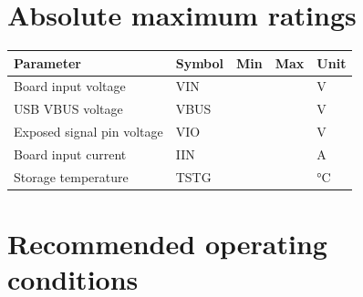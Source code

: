 \documentclass[10pt,a4paper,oneside]{report}
\begin{document}
\section{Absolute maximum ratings}\label{wiki-hardware-electrical-ratings--absolute-maximum-ratings}

{\def\LTcaptype{none} %
\begin{longtable}[]{@{}
  >{\raggedright\arraybackslash}p{}
  >{\raggedright\arraybackslash}p{}
  >{\raggedright\arraybackslash}p{}
  >{\raggedright\arraybackslash}p{}
  >{\raggedright\arraybackslash}p{}@{}}
\toprule\noalign{}
\begin{minipage}[b]{\linewidth}\raggedright
\textbf{Parameter}
\end{minipage} & \begin{minipage}[b]{\linewidth}\raggedright
\textbf{Symbol}
\end{minipage} & \begin{minipage}[b]{\linewidth}\raggedright
\textbf{Min}
\end{minipage} & \begin{minipage}[b]{\linewidth}\raggedright
\textbf{Max}
\end{minipage} & \begin{minipage}[b]{\linewidth}\raggedright
\textbf{Unit}
\end{minipage} \\
\midrule\noalign{}
\endhead
\bottomrule\noalign{}
\endlastfoot
Board input voltage & VIN & & & V \\
USB VBUS voltage & VBUS & & & V \\
Exposed signal pin voltage & VIO & & & V \\
Board input current & IIN & & & A \\
Storage temperature & TSTG & & & °C \\
\end{longtable}
}

\section{Recommended operating conditions}\label{wiki-hardware-electrical-ratings--recommended-operating-conditions}
\end{document}
